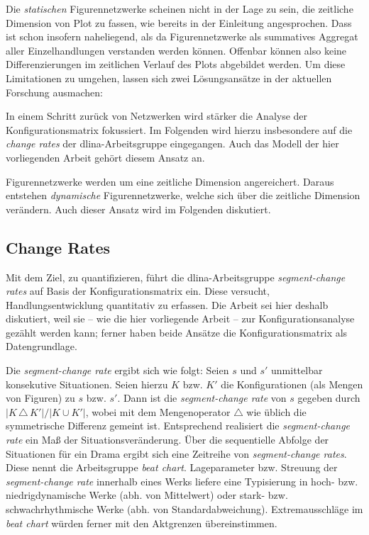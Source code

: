 \documentclass[a4paper,10pt,abstract=true,headings=small]{scrartcl}
\newcommand{\eng}[1]{\textenglish{\emph{#1}}}
\begin{document}
Die \emph{statischen} Figurennetzwerke scheinen nicht in der Lage zu sein, die zeitliche Dimension von Plot zu fassen, wie bereits in der Einleitung angesprochen.
Dass ist schon insofern naheliegend, als da Figurennetzwerke als summatives Aggregat aller Einzelhandlungen verstanden werden können.
Offenbar können also keine Differenzierungen im zeitlichen Verlauf des Plots abgebildet werden.
Um diese Limitationen zu umgehen, lassen sich zwei Lösungsansätze in der aktuellen Forschung ausmachen:
\begin{enumerate*}
    \item In einem Schritt zurück von Netzwerken wird stärker die Analyse der Konfigurationsmatrix fokussiert.
        Im Folgenden wird hierzu insbesondere auf die \eng{change rates} der dlina-Arbeitsgruppe eingegangen.
        Auch das Modell der hier vorliegenden Arbeit gehört diesem Ansatz an.
    \item Figurennetzwerke werden um eine zeitliche Dimension angereichert.
        Daraus entstehen \emph{dynamische} Figurennetzwerke, welche sich über die zeitliche Dimension verändern.
        Auch dieser Ansatz wird im Folgenden diskutiert.
\end{enumerate*}

\subsection{Change Rates}

Mit dem Ziel,  zu quantifizieren, führt die dlina-Arbeitsgruppe \emph{segment-change rates} auf Basis der Konfigurationsmatrix ein.
Diese versucht, Handlungsentwicklung quantitativ zu erfassen.
%
Die Arbeit sei hier deshalb diskutiert, weil sie – wie die hier vorliegende Arbeit – zur Konfigurationsanalyse gezählt werden kann; ferner haben beide Ansätze die Konfigurationsmatrix als Datengrundlage.\autocites{trilcke_netzwerkdynamik_2017}{fischer_network_2017}{trilcke_small_2020}

Die \emph{segment-change rate} ergibt sich wie folgt:
Seien $s$ und $s'$ unmittelbar konsekutive Situationen.
Seien hierzu $K$ bzw. $K'$ die Konfigurationen (als Mengen von Figuren) zu $s$ bzw. $s'$.
Dann ist die \emph{segment-change rate} von $s$ gegeben durch $|K\,\triangle\,K'|/|K \cup K'|$, wobei mit dem Mengenoperator $\triangle$ wie üblich die symmetrische Differenz gemeint ist.
Entsprechend realisiert die \emph{segment-change rate} ein Maß der Situationsveränderung.
Über die sequentielle Abfolge der Situationen für ein Drama ergibt sich eine Zeitreihe von \emph{segment-change rates}.
Diese nennt die Arbeitsgruppe \emph{beat chart}.
Lageparameter bzw. Streuung der \emph{segment-change rate} innerhalb eines Werks liefere eine Typisierung in hoch- bzw. niedrigdynamische Werke (abh. von Mittelwert) oder stark- bzw. schwachrhythmische Werke (abh. von Standardabweichung). %
Extremausschläge im \emph{beat chart} würden ferner mit den Aktgrenzen übereinstimmen.\autocite[Vgl. z.\,B.][439--440]{fischer_network_2017}
\end{document}
